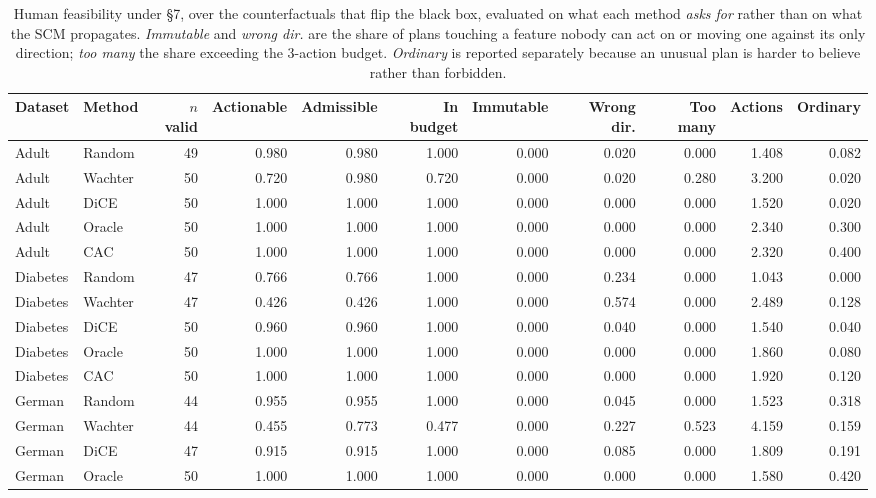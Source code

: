 \begin{table}[t]
\caption{Human feasibility under \S7, over the counterfactuals that flip the black box, evaluated on what each method \emph{asks for} rather than on what the SCM propagates. \emph{Immutable} and \emph{wrong dir.} are the share of plans touching a feature nobody can act on or moving one against its only direction; \emph{too many} the share exceeding the 3-action budget. \emph{Ordinary} is reported separately because an unusual plan is harder to believe rather than forbidden.}
\label{tab:feasibility}
\begin{tabular}{llrrrrrrrrr}
\toprule
Dataset & Method & $n$ valid & Actionable & Admissible & In budget & Immutable & Wrong dir. & Too many & Actions & Ordinary \\
\midrule
Adult & Random & 49 & 0.980 & 0.980 & 1.000 & 0.000 & 0.020 & 0.000 & 1.408 & 0.082 \\
Adult & Wachter & 50 & 0.720 & 0.980 & 0.720 & 0.000 & 0.020 & 0.280 & 3.200 & 0.020 \\
Adult & DiCE & 50 & 1.000 & 1.000 & 1.000 & 0.000 & 0.000 & 0.000 & 1.520 & 0.020 \\
Adult & Oracle & 50 & 1.000 & 1.000 & 1.000 & 0.000 & 0.000 & 0.000 & 2.340 & 0.300 \\
Adult & CAC & 50 & 1.000 & 1.000 & 1.000 & 0.000 & 0.000 & 0.000 & 2.320 & 0.400 \\
Diabetes & Random & 47 & 0.766 & 0.766 & 1.000 & 0.000 & 0.234 & 0.000 & 1.043 & 0.000 \\
Diabetes & Wachter & 47 & 0.426 & 0.426 & 1.000 & 0.000 & 0.574 & 0.000 & 2.489 & 0.128 \\
Diabetes & DiCE & 50 & 0.960 & 0.960 & 1.000 & 0.000 & 0.040 & 0.000 & 1.540 & 0.040 \\
Diabetes & Oracle & 50 & 1.000 & 1.000 & 1.000 & 0.000 & 0.000 & 0.000 & 1.860 & 0.080 \\
Diabetes & CAC & 50 & 1.000 & 1.000 & 1.000 & 0.000 & 0.000 & 0.000 & 1.920 & 0.120 \\
German & Random & 44 & 0.955 & 0.955 & 1.000 & 0.000 & 0.045 & 0.000 & 1.523 & 0.318 \\
German & Wachter & 44 & 0.455 & 0.773 & 0.477 & 0.000 & 0.227 & 0.523 & 4.159 & 0.159 \\
German & DiCE & 47 & 0.915 & 0.915 & 1.000 & 0.000 & 0.085 & 0.000 & 1.809 & 0.191 \\
German & Oracle & 50 & 1.000 & 1.000 & 1.000 & 0.000 & 0.000 & 0.000 & 1.580 & 0.420 \\

\end{tabular}
\end{table}
